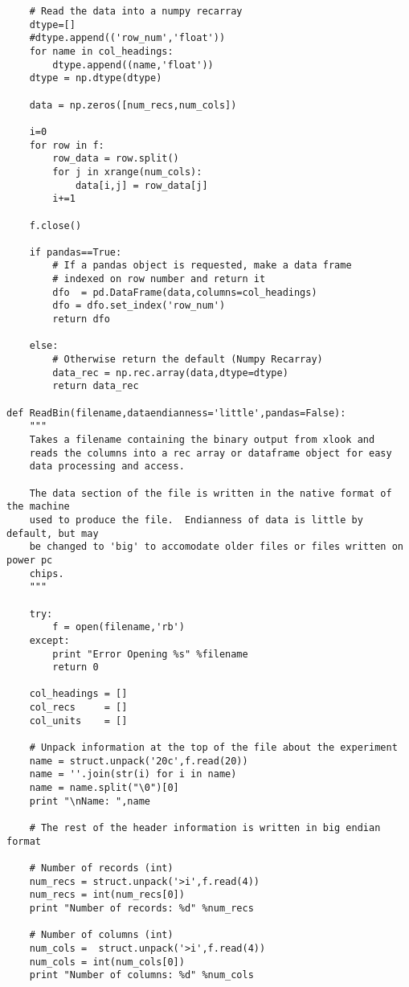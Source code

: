 \begin{lstlisting}
    # Read the data into a numpy recarray
    dtype=[]
    #dtype.append(('row_num','float'))
    for name in col_headings:
        dtype.append((name,'float'))
    dtype = np.dtype(dtype)
    
    data = np.zeros([num_recs,num_cols])
    
    i=0
    for row in f:
        row_data = row.split()
        for j in xrange(num_cols):
            data[i,j] = row_data[j]
        i+=1

    f.close()
    
    if pandas==True: 
        # If a pandas object is requested, make a data frame 
        # indexed on row number and return it
        dfo  = pd.DataFrame(data,columns=col_headings)
        dfo = dfo.set_index('row_num') 
        return dfo
        
    else:  
        # Otherwise return the default (Numpy Recarray)  
        data_rec = np.rec.array(data,dtype=dtype)
        return data_rec

def ReadBin(filename,dataendianness='little',pandas=False):
    """
    Takes a filename containing the binary output from xlook and
    reads the columns into a rec array or dataframe object for easy 
    data processing and access.
    
    The data section of the file is written in the native format of the machine
    used to produce the file.  Endianness of data is little by default, but may
    be changed to 'big' to accomodate older files or files written on power pc 
    chips.
    """

    try:
        f = open(filename,'rb')
    except:
        print "Error Opening %s" %filename
        return 0
    
    col_headings = []
    col_recs     = []
    col_units    = []
    
    # Unpack information at the top of the file about the experiment
    name = struct.unpack('20c',f.read(20))
    name = ''.join(str(i) for i in name)
    name = name.split("\0")[0]
    print "\nName: ",name
    
    # The rest of the header information is written in big endian format
    
    # Number of records (int)
    num_recs = struct.unpack('>i',f.read(4))
    num_recs = int(num_recs[0])
    print "Number of records: %d" %num_recs
    
    # Number of columns (int)
    num_cols =  struct.unpack('>i',f.read(4))
    num_cols = int(num_cols[0])
    print "Number of columns: %d" %num_cols
    

\end{lstlisting}
